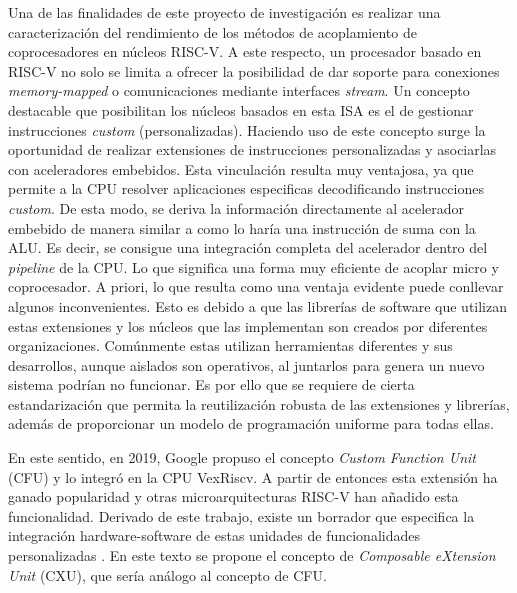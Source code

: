 Una de las finalidades de este proyecto de investigación es realizar una caracterización del rendimiento de los métodos de acoplamiento de coprocesadores en núcleos RISC-V.
A este respecto, un procesador basado en RISC-V no solo se limita a ofrecer la posibilidad de dar soporte para conexiones \textit{memory-mapped} o comunicaciones mediante interfaces \textit{stream}.
Un concepto destacable que posibilitan los núcleos basados en esta ISA es el de gestionar instrucciones \textit{custom} (personalizadas).
Haciendo uso de este concepto surge la oportunidad de realizar extensiones de instrucciones personalizadas y asociarlas con aceleradores embebidos.
Esta vinculación resulta muy ventajosa, ya que permite a la CPU resolver aplicaciones especificas decodificando instrucciones \textit{custom}.
De esta modo, se deriva la información directamente al acelerador embebido de manera similar a como lo haría una instrucción de suma con la ALU. 
Es decir, se consigue una integración completa del acelerador dentro del \textit{pipeline} de la CPU.
Lo que significa una forma muy eficiente de acoplar micro y coprocesador.
A priori, lo que resulta como una ventaja evidente puede conllevar algunos inconvenientes.
Esto es debido a que las librerías de software que utilizan estas extensiones y los núcleos que las implementan son creados por diferentes organizaciones.
Comúnmente estas utilizan herramientas diferentes y sus desarrollos, aunque aislados son operativos, al juntarlos para genera un nuevo sistema podrían no funcionar.
Es por ello que se requiere de cierta estandarización que permita la reutilización robusta de las extensiones y librerías, además de proporcionar un modelo de programación uniforme para todas ellas.

En este sentido, en 2019, Google propuso el concepto \textit{Custom Function Unit} (CFU) \cite{prakash23} y lo integró en la CPU VexRiscv.
A partir de entonces esta extensión ha ganado popularidad y otras microarquitecturas RISC-V han añadido esta funcionalidad.
Derivado de este trabajo, existe un borrador que especifica la integración hardware-software de estas unidades de funcionalidades personalizadas \cite{CFU-draft}. 
En este texto se propone el concepto de \textit{Composable eXtension Unit} (CXU), que sería análogo al concepto de CFU. 

